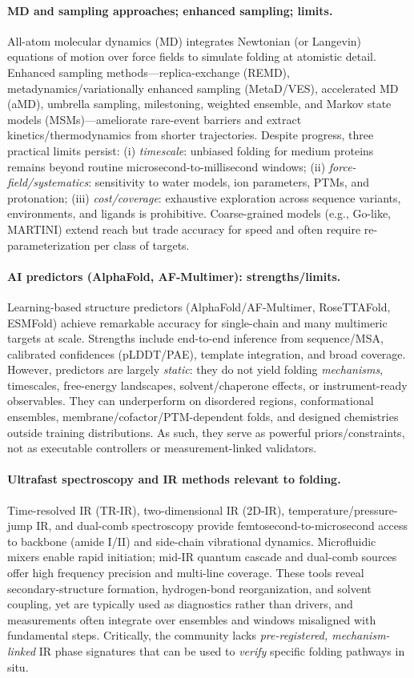 \documentclass[12pt,a4paper]{article}
\begin{document}
\paragraph{MD and sampling approaches; enhanced sampling; limits.}
All-atom molecular dynamics (MD) integrates Newtonian (or Langevin) equations of motion over force fields to simulate folding at atomistic detail. Enhanced sampling methods---replica-exchange (REMD), metadynamics/variationally enhanced sampling (MetaD/VES), accelerated MD (aMD), umbrella sampling, milestoning, weighted ensemble, and Markov state models (MSMs)---ameliorate rare-event barriers and extract kinetics/thermodynamics from shorter trajectories. Despite progress, three practical limits persist: (i) \emph{timescale}: unbiased folding for medium proteins remains beyond routine microsecond-to-millisecond windows; (ii) \emph{force-field/systematics}: sensitivity to water models, ion parameters, PTMs, and protonation; (iii) \emph{cost/coverage}: exhaustive exploration across sequence variants, environments, and ligands is prohibitive. Coarse-grained models (e.g., Go-like, MARTINI) extend reach but trade accuracy for speed and often require re-parameterization per class of targets.

\paragraph{AI predictors (AlphaFold, AF‑Multimer): strengths/limits.}
Learning-based structure predictors (AlphaFold/AF‑Multimer, RoseTTAFold, ESMFold) achieve remarkable accuracy for single-chain and many multimeric targets at scale. Strengths include end-to-end inference from sequence/MSA, calibrated confidences (pLDDT/PAE), template integration, and broad coverage. However, predictors are largely \emph{static}: they do not yield folding \emph{mechanisms}, timescales, free-energy landscapes, solvent/chaperone effects, or instrument-ready observables. They can underperform on disordered regions, conformational ensembles, membrane/cofactor/PTM-dependent folds, and designed chemistries outside training distributions. As such, they serve as powerful priors/constraints, not as executable controllers or measurement-linked validators.

\paragraph{Ultrafast spectroscopy and IR methods relevant to folding.}
Time-resolved IR (TR-IR), two-dimensional IR (2D-IR), temperature/pressure-jump IR, and dual-comb spectroscopy provide femtosecond-to-microsecond access to backbone (amide I/II) and side-chain vibrational dynamics. Microfluidic mixers enable rapid initiation; mid-IR quantum cascade and dual-comb sources offer high frequency precision and multi-line coverage. These tools reveal secondary-structure formation, hydrogen-bond reorganization, and solvent coupling, yet are typically used as diagnostics rather than drivers, and measurements often integrate over ensembles and windows misaligned with fundamental steps. Critically, the community lacks \emph{pre-registered, mechanism-linked} IR phase signatures that can be used to \emph{verify} specific folding pathways in situ.
\end{document}
